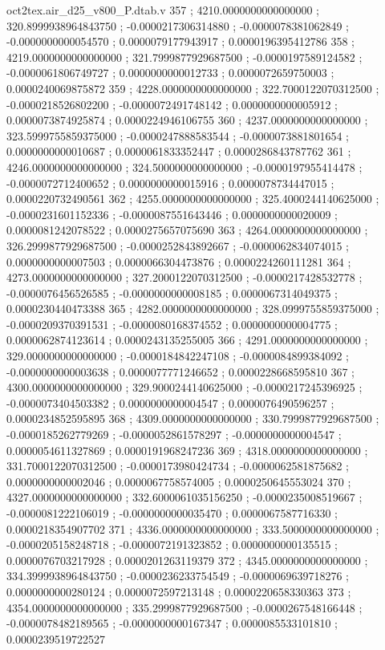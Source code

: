 \begin{filecontents}[overwrite]{oct2tex.air_d25_v800_P.dtab.v}
357 ; 4210.0000000000000000 ; 320.8999938964843750 ; -0.0000217306314880 ; -0.0000078381062849 ; -0.0000000000054570 ; 0.0000079177943917 ; 0.0000196395412786
358 ; 4219.0000000000000000 ; 321.7999877929687500 ; -0.0000197589124582 ; -0.0000061806749727 ; 0.0000000000012733 ; 0.0000072659750003 ; 0.0000240069875872
359 ; 4228.0000000000000000 ; 322.7000122070312500 ; -0.0000218526802200 ; -0.0000072491748142 ; 0.0000000000005912 ; 0.0000073874925874 ; 0.0000224946106755
360 ; 4237.0000000000000000 ; 323.5999755859375000 ; -0.0000247888583544 ; -0.0000073881801654 ; 0.0000000000010687 ; 0.0000061833352447 ; 0.0000286843787762
361 ; 4246.0000000000000000 ; 324.5000000000000000 ; -0.0000197955414478 ; -0.0000072712400652 ; 0.0000000000015916 ; 0.0000078734447015 ; 0.0000220732490561
362 ; 4255.0000000000000000 ; 325.4000244140625000 ; -0.0000231601152336 ; -0.0000087551643446 ; 0.0000000000020009 ; 0.0000081242078522 ; 0.0000275657075690
363 ; 4264.0000000000000000 ; 326.2999877929687500 ; -0.0000252843892667 ; -0.0000062834074015 ; 0.0000000000007503 ; 0.0000066304473876 ; 0.0000224260111281
364 ; 4273.0000000000000000 ; 327.2000122070312500 ; -0.0000217428532778 ; -0.0000076456526585 ; -0.0000000000008185 ; 0.0000067314049375 ; 0.0000230440473388
365 ; 4282.0000000000000000 ; 328.0999755859375000 ; -0.0000209370391531 ; -0.0000080168374552 ; 0.0000000000004775 ; 0.0000062874123614 ; 0.0000243135255005
366 ; 4291.0000000000000000 ; 329.0000000000000000 ; -0.0000184842247108 ; -0.0000084899384092 ; -0.0000000000003638 ; 0.0000077771246652 ; 0.0000228668595810
367 ; 4300.0000000000000000 ; 329.9000244140625000 ; -0.0000217245396925 ; -0.0000073404503382 ; 0.0000000000004547 ; 0.0000076490596257 ; 0.0000234852595895
368 ; 4309.0000000000000000 ; 330.7999877929687500 ; -0.0000185262779269 ; -0.0000052861578297 ; -0.0000000000004547 ; 0.0000054611327869 ; 0.0000191968247236
369 ; 4318.0000000000000000 ; 331.7000122070312500 ; -0.0000173980424734 ; -0.0000062581875682 ; 0.0000000000002046 ; 0.0000067758574005 ; 0.0000250645553024
370 ; 4327.0000000000000000 ; 332.6000061035156250 ; -0.0000235008519667 ; -0.0000081222106019 ; -0.0000000000035470 ; 0.0000067587716330 ; 0.0000218354907702
371 ; 4336.0000000000000000 ; 333.5000000000000000 ; -0.0000205158248718 ; -0.0000072191323852 ; 0.0000000000135515 ; 0.0000076703217928 ; 0.0000201263119379
372 ; 4345.0000000000000000 ; 334.3999938964843750 ; -0.0000236233754549 ; -0.0000069639718276 ; 0.0000000000280124 ; 0.0000072597213148 ; 0.0000220658330363
373 ; 4354.0000000000000000 ; 335.2999877929687500 ; -0.0000267548166448 ; -0.0000078482189565 ; -0.0000000000167347 ; 0.0000085533101810 ; 0.0000239519722527

\end{filecontents}
